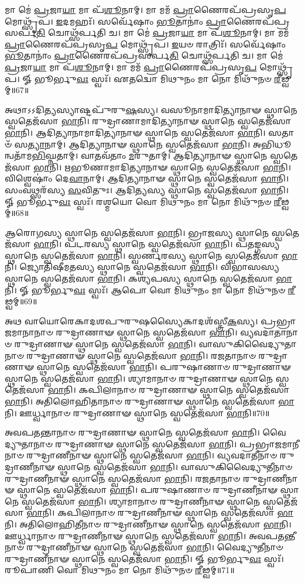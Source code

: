 𑌮𑌾 𑌮𑍇॑ \ul{𑌪𑍍𑌰}\-𑌜𑌾\-\ul{𑌯𑌾} 𑌮𑌾 𑌪᳴\-\ul{𑌶𑍂}\-𑌨𑌾𑌮𑍍। 𑌮𑌾 𑌮𑌮᳴ \ul{𑌪𑍍𑌰𑌾}\-𑌣𑍈𑌰𑌪᳴𑌪𑍍𑌰𑌸𑍃\-\ul{𑌪} 𑌮𑍋𑌥𑍍𑌸𑍃᳴𑌪। 
\-\ul{𑌇}\-𑌦𑌮𑌹𑌃᳴। 𑌸𑌰𑍍𑌵𑍇᳴𑌷𑌾𑌂 \ul{𑌭𑍂}\-𑌤𑌾𑌨𑌾𑌂॑ \ul{𑌪𑍍𑌰𑌾}\-𑌣𑍈𑌰𑌪᳴𑌪𑍍𑌰𑌸𑌰𑍍𑌪\-\ul{𑌤𑌿} 𑌚𑍋𑌥𑍍𑌸᳴𑌰𑍍𑌪𑌤𑌿 𑌚। 
𑌮𑌾 𑌮𑍇॑ \ul{𑌪𑍍𑌰}\-𑌜𑌾\-\ul{𑌯𑌾} 𑌮𑌾 𑌪᳴\-\ul{𑌶𑍂}\-𑌨𑌾𑌮𑍍। 𑌮𑌾 𑌮𑌮᳴ \ul{𑌪𑍍𑌰𑌾}\-𑌣𑍈𑌰𑌪᳴𑌪𑍍𑌰𑌸𑍃\-\ul{𑌪} 𑌮𑍋𑌥𑍍𑌸𑍃᳴𑌪। 
\-\ul{𑌇}\-𑌯𑍞 𑌰𑌾𑌤𑍍𑌰𑌿𑌃᳴। 𑌸𑌰𑍍𑌵𑍇᳴𑌷𑌾𑌂 \ul{𑌭𑍂}\-𑌤𑌾𑌨𑌾𑌂॑ \ul{𑌪𑍍𑌰𑌾}\-𑌣𑍈𑌰𑌪᳴𑌪𑍍𑌰𑌸𑌰𑍍𑌪\-\ul{𑌤𑌿} 𑌚𑍋𑌥𑍍𑌸᳴𑌰𑍍𑌪𑌤𑌿 𑌚। 
𑌮𑌾 𑌮𑍇॑ \ul{𑌪𑍍𑌰}\-𑌜𑌾\-\ul{𑌯𑌾} 𑌮𑌾 𑌪᳴\-\ul{𑌶𑍂}\-𑌨𑌾𑌮𑍍। 𑌮𑌾 𑌮𑌮᳴ \ul{𑌪𑍍𑌰𑌾}\-𑌣𑍈𑌰𑌪᳴𑌪𑍍𑌰𑌸𑍃\-\ul{𑌪} 𑌮𑍋𑌥𑍍𑌸𑍃᳴𑌪। 
𑍐 𑌭𑍂𑌰𑍍𑌭𑍁\-\ul{𑌵𑌃} 𑌸𑍍𑌵𑌃᳴। 𑌏𑌤𑌦𑍍𑌵𑍋 𑌮𑌿𑌥𑍁𑌨𑌂 𑌮𑌾 𑌨𑍋 𑌮𑌿𑌥𑍁᳴𑌨𑍞 \ul{𑌰𑍀}\-𑌢𑍍𑌵𑌮𑍍॥67॥\anuvakamend


𑌅𑌥𑌾𑌽𑌽𑌦𑌿𑌤𑍍𑌯𑌸𑍍𑌯𑌾𑌷𑍍𑌟𑌪𑍁᳴𑌰𑍁\-\ul{𑌷}\-𑌸𑍍𑌯। 
𑌵𑌸𑍂𑌨𑌾𑌮𑌾𑌦𑌿𑌤𑍍𑌯𑌾𑌨𑌾𑍟 𑌸𑍍𑌥𑌾𑌨𑍇 𑌸𑍍𑌵𑌤𑍇𑌜᳴𑌸𑌾 \ul{𑌭𑌾}\-𑌨𑌿। 
𑌰𑍁𑌦𑍍𑌰𑌾𑌣𑌾𑌮𑌾𑌦𑌿𑌤𑍍𑌯𑌾𑌨𑌾𑍟 𑌸𑍍𑌥𑌾𑌨𑍇 𑌸𑍍𑌵𑌤𑍇𑌜᳴𑌸𑌾 \ul{𑌭𑌾}\-𑌨𑌿। 
𑌆𑌦𑌿𑌤𑍍𑌯𑌾𑌨𑌾𑌮𑌾𑌦𑌿\-𑌤𑍍𑌯𑌾𑌨𑌾𑍟 𑌸𑍍𑌥𑌾𑌨𑍇 𑌸𑍍𑌵𑌤𑍇𑌜᳴𑌸𑌾 \ul{𑌭𑌾}\-𑌨𑌿। 
𑌸𑌤𑌾𑍞᳴ 𑌸\-\ul{𑌤𑍍𑌯𑌾}\-𑌨𑌾𑌮𑍍। 𑌆𑌦𑌿𑌤𑍍𑌯𑌾𑌨𑌾𑍟 𑌸𑍍𑌥𑌾𑌨𑍇 𑌸𑍍𑌵𑌤𑍇𑌜᳴𑌸𑌾 \ul{𑌭𑌾}\-𑌨𑌿। 
𑌅𑌭𑌿𑌧𑍂𑌨𑍍𑌵𑌤𑌾᳴\-𑌮\-\ul{𑌭𑌿}\-𑌘𑍍𑌨𑌤𑌾𑌮𑍍। 𑌵𑌾𑌤𑌵᳴𑌤𑌾𑌂 \ul{𑌮}\-𑌰𑍁𑌤𑌾𑌮𑍍। 
𑌆𑌦𑌿𑌤𑍍𑌯𑌾𑌨𑌾𑍟 𑌸𑍍𑌥𑌾𑌨𑍇 𑌸𑍍𑌵𑌤𑍇𑌜᳴𑌸𑌾 \ul{𑌭𑌾}\-𑌨𑌿। 
𑌋𑌭𑍂𑌣𑌾𑌮𑌾𑌦𑌿𑌤𑍍𑌯𑌾𑌨𑌾𑍟 𑌸𑍍𑌥𑌾𑌨𑍇 𑌸𑍍𑌵𑌤𑍇𑌜᳴𑌸𑌾 \ul{𑌭𑌾}\-𑌨𑌿। 
𑌵𑌿𑌶𑍍𑌵𑍇𑌷𑌾𑌂॑ 𑌦𑍇\-\ul{𑌵𑌾}\-𑌨𑌾𑌮𑍍। 𑌆𑌦𑌿𑌤𑍍𑌯𑌾𑌨𑌾𑍟 𑌸𑍍𑌥𑌾𑌨𑍇 𑌸𑍍𑌵𑌤𑍇𑌜᳴𑌸𑌾 \ul{𑌭𑌾}\-𑌨𑌿। 
𑌸𑌂𑌵𑌥𑍍𑌸𑌰᳴𑌸𑍍𑌯 \ul{𑌸}\-𑌵𑌿𑌤𑍁𑌃। 𑌆𑌦𑌿𑌤𑍍𑌯𑌸𑍍𑌯 𑌸𑍍𑌥𑌾𑌨𑍇 𑌸𑍍𑌵𑌤𑍇𑌜᳴𑌸𑌾 \ul{𑌭𑌾}\-𑌨𑌿। 
𑍐 𑌭𑍂𑌰𑍍𑌭𑍁\-\ul{𑌵𑌃} 𑌸𑍍𑌵𑌃᳴। 𑌰𑌶𑍍𑌮𑌯𑍋 𑌵𑍋 𑌮𑌿𑌥𑍁𑌨𑌂 𑌮𑌾 𑌨𑍋 𑌮𑌿𑌥𑍁᳴𑌨𑍞 \ul{𑌰𑍀}\-𑌢𑍍𑌵𑌮𑍍॥68॥\anuvakamend


𑌆𑌰𑍋𑌗𑌸𑍍𑌯 𑌸𑍍𑌥𑌾𑌨𑍇 𑌸𑍍𑌵𑌤𑍇𑌜᳴𑌸𑌾 \ul{𑌭𑌾}\-𑌨𑌿। 𑌭𑍍𑌰𑌾𑌜𑌸𑍍𑌯 𑌸𑍍𑌥𑌾𑌨𑍇 𑌸𑍍𑌵𑌤𑍇𑌜᳴𑌸𑌾 \ul{𑌭𑌾}\-𑌨𑌿। 
𑌪𑌟𑌰𑌸𑍍𑌯 𑌸𑍍𑌥𑌾𑌨𑍇 𑌸𑍍𑌵𑌤𑍇𑌜᳴𑌸𑌾 \ul{𑌭𑌾}\-𑌨𑌿। 𑌪𑌤𑌙𑍍𑌗𑌸𑍍𑌯 𑌸𑍍𑌥𑌾𑌨𑍇 𑌸𑍍𑌵𑌤𑍇𑌜᳴𑌸𑌾 \ul{𑌭𑌾}\-𑌨𑌿। 
𑌸𑍍𑌵𑌰𑍍𑌣𑌰𑌸𑍍𑌯 𑌸𑍍𑌥𑌾𑌨𑍇 𑌸𑍍𑌵𑌤𑍇𑌜᳴𑌸𑌾 \ul{𑌭𑌾}\-𑌨𑌿। 𑌜𑍍𑌯𑍋𑌤𑌿𑌷𑍀𑌮𑌤𑌸𑍍𑌯 𑌸𑍍𑌥𑌾𑌨𑍇 𑌸𑍍𑌵𑌤𑍇𑌜᳴𑌸𑌾 \ul{𑌭𑌾}\-𑌨𑌿। 
𑌵𑌿𑌭𑌾𑌸𑌸𑍍𑌯 𑌸𑍍𑌥𑌾𑌨𑍇 𑌸𑍍𑌵𑌤𑍇𑌜᳴𑌸𑌾 \ul{𑌭𑌾}\-𑌨𑌿। 𑌕𑌶𑍍𑌯𑌪𑌸𑍍𑌯 𑌸𑍍𑌥𑌾𑌨𑍇 𑌸𑍍𑌵𑌤𑍇𑌜᳴𑌸𑌾 \ul{𑌭𑌾}\-𑌨𑌿। 
𑍐 𑌭𑍂𑌰𑍍𑌭𑍁\-\ul{𑌵𑌃} 𑌸𑍍𑌵𑌃᳴। 𑌆𑌪𑍋 𑌵𑍋 𑌮𑌿𑌥𑍁𑌨𑌂 𑌮𑌾 𑌨𑍋 𑌮𑌿𑌥𑍁᳴𑌨𑍞 \ul{𑌰𑍀}\-𑌢𑍍𑌵𑌮𑍍॥69॥\anuvakamend


𑌅𑌥 𑌵𑌾𑌯𑍋𑌰𑍇𑌕𑌾𑌦𑌶𑌪𑍁𑌰𑍁𑌷𑌸𑍍𑌯𑍈𑌕𑌾𑌦𑌶᳴𑌸𑍍𑌤𑍍𑌰𑍀\-\ul{𑌕}\-𑌸𑍍𑌯। 
𑌪𑍍𑌰𑌭𑍍𑌰𑌾𑌜𑌮𑌾𑌨𑌾𑌨𑌾𑍞 𑌰𑍁𑌦𑍍𑌰𑌾𑌣𑌾𑍟 𑌸𑍍𑌥𑌾𑌨𑍇 𑌸𑍍𑌵𑌤𑍇𑌜᳴𑌸𑌾 \ul{𑌭𑌾}\-𑌨𑌿। 
𑌵𑍍𑌯𑌵𑌦𑌾𑌤𑌾𑌨𑌾𑍞 𑌰𑍁𑌦𑍍𑌰𑌾𑌣𑌾𑍟 𑌸𑍍𑌥𑌾𑌨𑍇 𑌸𑍍𑌵𑌤𑍇𑌜᳴𑌸𑌾 \ul{𑌭𑌾}\-𑌨𑌿। 
𑌵𑌾𑌸𑍁𑌕𑌿𑌵𑍈𑌦𑍍𑌯𑍁𑌤𑌾𑌨𑌾𑍞 𑌰𑍁𑌦𑍍𑌰𑌾𑌣𑌾𑍟 𑌸𑍍𑌥𑌾𑌨𑍇 𑌸𑍍𑌵𑌤𑍇𑌜᳴𑌸𑌾 \ul{𑌭𑌾}\-𑌨𑌿। 
𑌰𑌜𑌤𑌾𑌨𑌾𑍞 𑌰𑍁𑌦𑍍𑌰𑌾𑌣𑌾𑍟 𑌸𑍍𑌥𑌾𑌨𑍇 𑌸𑍍𑌵𑌤𑍇𑌜᳴𑌸𑌾 \ul{𑌭𑌾}\-𑌨𑌿। 
𑌪𑌰𑍁𑌷𑌾𑌣𑌾𑍞 𑌰𑍁𑌦𑍍𑌰𑌾𑌣𑌾𑍟 𑌸𑍍𑌥𑌾𑌨𑍇 𑌸𑍍𑌵𑌤𑍇𑌜᳴𑌸𑌾 \ul{𑌭𑌾}\-𑌨𑌿। 
𑌶𑍍𑌯𑌾𑌮𑌾𑌨𑌾𑍞 𑌰𑍁𑌦𑍍𑌰𑌾𑌣𑌾𑍟 𑌸𑍍𑌥𑌾𑌨𑍇 𑌸𑍍𑌵𑌤𑍇𑌜᳴𑌸𑌾 \ul{𑌭𑌾}\-𑌨𑌿। 
𑌕𑌪𑌿𑌲𑌾𑌨𑌾𑍞 𑌰𑍁𑌦𑍍𑌰𑌾𑌣𑌾𑍟 𑌸𑍍𑌥𑌾𑌨𑍇 𑌸𑍍𑌵𑌤𑍇𑌜᳴𑌸𑌾 \ul{𑌭𑌾}\-𑌨𑌿। 
𑌅𑌤𑌿𑌲𑍋𑌹𑌿𑌤𑌾𑌨𑌾𑍞 𑌰𑍁𑌦𑍍𑌰𑌾𑌣𑌾𑍟 𑌸𑍍𑌥𑌾𑌨𑍇 𑌸𑍍𑌵𑌤𑍇𑌜᳴𑌸𑌾 \ul{𑌭𑌾}\-𑌨𑌿। 
𑌊𑌰𑍍𑌧𑍍𑌵𑌾𑌨𑌾𑍞 𑌰𑍁𑌦𑍍𑌰𑌾𑌣𑌾𑍟 𑌸𑍍𑌥𑌾𑌨𑍇 𑌸𑍍𑌵𑌤𑍇𑌜᳴𑌸𑌾 \ul{𑌭𑌾}\-𑌨𑌿॥70॥


𑌅𑌵𑌪𑌤𑌨𑍍𑌤𑌾𑌨𑌾𑍞 𑌰𑍁𑌦𑍍𑌰𑌾𑌣𑌾𑍟 𑌸𑍍𑌥𑌾𑌨𑍇 𑌸𑍍𑌵𑌤𑍇𑌜᳴𑌸𑌾 \ul{𑌭𑌾}\-𑌨𑌿। 
𑌵𑍈𑌦𑍍𑌯𑍁𑌤𑌾𑌨𑌾𑍞 𑌰𑍁𑌦𑍍𑌰𑌾𑌣𑌾𑍟 𑌸𑍍𑌥𑌾𑌨𑍇 𑌸𑍍𑌵𑌤𑍇𑌜᳴𑌸𑌾 \ul{𑌭𑌾}\-𑌨𑌿। 
𑌪𑍍𑌰𑌭𑍍𑌰𑌾𑌜𑌮𑌾𑌨𑍀𑌨𑌾𑍞 𑌰𑍁𑌦𑍍𑌰𑌾𑌣𑍀𑌨𑌾𑍟 𑌸𑍍𑌥𑌾𑌨𑍇 𑌸𑍍𑌵𑌤𑍇𑌜᳴𑌸𑌾 \ul{𑌭𑌾}\-𑌨𑌿। 
𑌵𑍍𑌯𑌵𑌦𑌾𑌤𑍀𑌨𑌾𑍞 𑌰𑍁𑌦𑍍𑌰𑌾𑌣𑍀𑌨𑌾𑍟 𑌸𑍍𑌥𑌾𑌨𑍇 𑌸𑍍𑌵𑌤𑍇𑌜᳴𑌸𑌾 \ul{𑌭𑌾}\-𑌨𑌿। 
𑌵𑌾𑌸𑍁𑌕𑌿𑌵𑍈𑌦𑍍𑌯𑍁𑌤𑍀𑌨𑌾𑍞 𑌰𑍁𑌦𑍍𑌰𑌾𑌣𑍀𑌨𑌾𑍟 𑌸𑍍𑌥𑌾𑌨𑍇 𑌸𑍍𑌵𑌤𑍇𑌜᳴𑌸𑌾 \ul{𑌭𑌾}\-𑌨𑌿। 
𑌰𑌜𑌤𑌾𑌨𑌾𑍞 𑌰𑍁𑌦𑍍𑌰𑌾𑌣𑍀𑌨𑌾𑍟 𑌸𑍍𑌥𑌾𑌨𑍇 𑌸𑍍𑌵𑌤𑍇𑌜᳴𑌸𑌾 \ul{𑌭𑌾}\-𑌨𑌿। 
𑌪𑌰𑍁𑌷𑌾𑌣𑌾𑍞 𑌰𑍁𑌦𑍍𑌰𑌾𑌣𑍀𑌨𑌾𑍟 𑌸𑍍𑌥𑌾𑌨𑍇 𑌸𑍍𑌵𑌤𑍇𑌜᳴𑌸𑌾 \ul{𑌭𑌾}\-𑌨𑌿। 
𑌶𑍍𑌯𑌾𑌮𑌾𑌨𑌾𑍞 𑌰𑍁𑌦𑍍𑌰𑌾𑌣𑍀𑌨𑌾𑍟 𑌸𑍍𑌥𑌾𑌨𑍇 𑌸𑍍𑌵𑌤𑍇𑌜᳴𑌸𑌾 \ul{𑌭𑌾}\-𑌨𑌿। 
𑌕𑌪𑌿𑌲𑌾𑌨𑌾𑍞 𑌰𑍁𑌦𑍍𑌰𑌾𑌣𑍀𑌨𑌾𑍟 𑌸𑍍𑌥𑌾𑌨𑍇 𑌸𑍍𑌵𑌤𑍇𑌜᳴𑌸𑌾 \ul{𑌭𑌾}\-𑌨𑌿। 
𑌅𑌤𑌿𑌲𑍋𑌹𑌿𑌤𑍀𑌨𑌾𑍞 𑌰𑍁𑌦𑍍𑌰𑌾𑌣𑍀𑌨𑌾𑍟 𑌸𑍍𑌥𑌾𑌨𑍇 𑌸𑍍𑌵𑌤𑍇𑌜᳴𑌸𑌾 \ul{𑌭𑌾}\-𑌨𑌿। 
𑌊𑌰𑍍𑌧𑍍𑌵𑌾𑌨𑌾𑍞 𑌰𑍁𑌦𑍍𑌰𑌾𑌣𑍀𑌨𑌾𑍟 𑌸𑍍𑌥𑌾𑌨𑍇 𑌸𑍍𑌵𑌤𑍇𑌜᳴𑌸𑌾 \ul{𑌭𑌾}\-𑌨𑌿। 
𑌅𑌵𑌪𑌤𑌨𑍍𑌤𑍀𑌨𑌾𑍞 𑌰𑍁𑌦𑍍𑌰𑌾𑌣𑍀𑌨𑌾𑍟 𑌸𑍍𑌥𑌾𑌨𑍇 𑌸𑍍𑌵𑌤𑍇𑌜᳴𑌸𑌾 \ul{𑌭𑌾}\-𑌨𑌿। 
𑌵𑍈𑌦𑍍𑌯𑍁𑌤𑍀𑌨𑌾𑍞 𑌰𑍁𑌦𑍍𑌰𑌾𑌣𑍀𑌨𑌾𑍟 𑌸𑍍𑌥𑌾𑌨𑍇 𑌸𑍍𑌵𑌤𑍇𑌜᳴𑌸𑌾 \ul{𑌭𑌾}\-𑌨𑌿। 
𑍐 𑌭𑍂𑌰𑍍𑌭𑍁\-\ul{𑌵𑌃} 𑌸𑍍𑌵𑌃᳴। 𑌰𑍂𑌪𑌾𑌣𑌿 𑌵𑍋 𑌮𑌿𑌥𑍁𑌨𑌂 𑌮𑌾 𑌨𑍋 𑌮𑌿𑌥𑍁᳴𑌨𑍞 \ul{𑌰𑍀}\-𑌢𑍍𑌵𑌮𑍍॥71॥\anuvakamend



